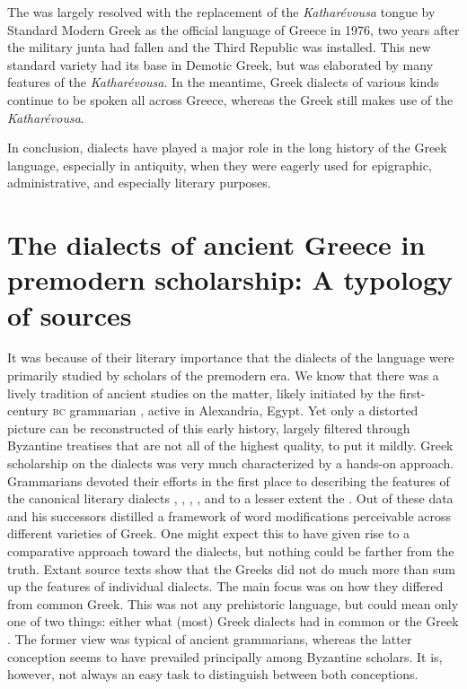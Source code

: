 The  was largely resolved with the replacement of the \textit{Katharévousa} tongue by Standard Modern Greek as the official language of Greece in 1976, two years after the military junta had fallen and the Third  Republic was installed. This new standard variety had its base in Demotic Greek, but was elaborated by many features of the \textit{Katharévousa}. In the meantime,  Greek dialects of various kinds continue to be spoken all across Greece, whereas the Greek  still makes use of the \textit{Katharévousa}.

In conclusion, dialects have played a major role in the long history of the Greek language, especially in antiquity, when they were eagerly used for epigraphic, administrative, and especially literary purposes.

\section[The dialects of ancient Greece in premodern scholarship]{The dialects of ancient Greece in premodern scholarship: A typology of sources}\label{sec:1.2}

It was because of their literary importance that the dialects of the  language were primarily studied by scholars of the premodern era. We know that there was a lively tradition of ancient studies on the matter, likely initiated by the first-century \textsc{bc} grammarian , active in Alexandria, Egypt. Yet only a distorted picture can be reconstructed of this early history, largely filtered through Byzantine treatises that are not all of the highest quality, to put it mildly. Greek scholarship on the dialects was very much characterized by a hands-on approach. Grammarians devoted their efforts in the first place to describing the features of the canonical literary dialects , , , , and to a lesser extent the . Out of these data  and his successors distilled a framework of word modifications perceivable across different varieties of Greek. One might expect this to have given rise to a comparative approach toward the dialects, but nothing could be farther from the truth. Extant source texts show that the Greeks did not do much more than sum up the features of individual dialects. The main focus was on how they differed from common Greek. This was not any prehistoric  language, but could mean only one of two things: either what (most) Greek dialects had in common or the Greek . The former view was typical of ancient grammarians, whereas the latter conception seems to have prevailed principally among Byzantine scholars. It is, however, not always an easy task to distinguish between both conceptions.


